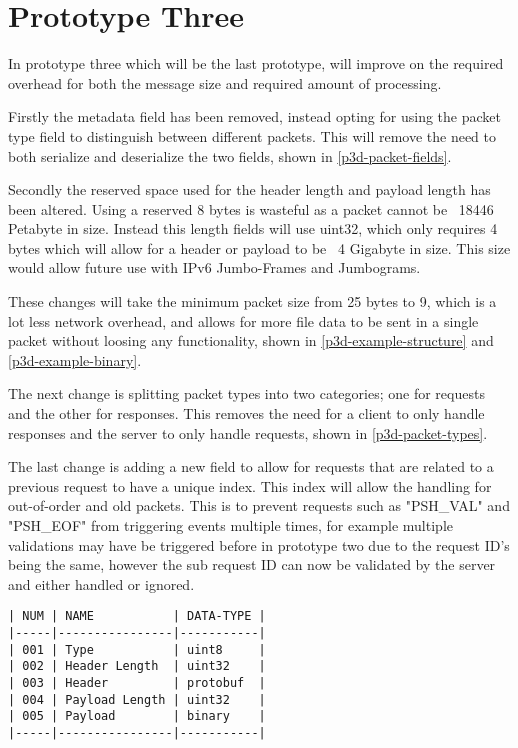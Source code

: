 \section{Prototype Three}
In prototype three which will be the last prototype, will improve on the required overhead for both the message size and required amount of processing.

Firstly the metadata field has been removed, instead opting for using the packet type field to distinguish between different packets. This will remove the need to both serialize and deserialize the two fields, shown in \ref{p3d-packet-fields}.

Secondly the reserved space used for the header length and payload length has been altered. Using a reserved 8 bytes is wasteful as a packet cannot be ~18446 Petabyte in size. Instead this length fields will use uint32, which only requires 4 bytes which will allow for a header or payload to be ~4 Gigabyte in size. This size would allow future use with IPv6 Jumbo-Frames and Jumbograms.

These changes will take the minimum packet size from 25 bytes to 9, which is a lot less network overhead, and allows for more file data to be sent in a single packet without loosing any functionality, shown in \ref{p3d-example-structure} and \ref{p3d-example-binary}.

The next change is splitting packet types into two categories; one for requests and the other for responses. This removes the need for a client to only handle responses and the server to only handle requests, shown in \ref{p3d-packet-types}.

The last change is adding a new field to allow for requests that are related to a previous request to have a unique index. This index will allow the handling for out-of-order and old packets. This is to prevent requests such as "PSH_VAL" and "PSH_EOF" from triggering events multiple times, for example multiple validations may have be triggered before in prototype two due to the request ID's being the same, however the sub request ID can now be validated by the server and either handled or ignored.

\FloatBarrier

\begin{lstlisting}[float,caption={Prototype Three Packet Fields},label=p3d-packet-fields]
| NUM | NAME           | DATA-TYPE |
|-----|----------------|-----------|
| 001 | Type           | uint8     |
| 002 | Header Length  | uint32    |
| 003 | Header         | protobuf  |
| 004 | Payload Length | uint32    |
| 005 | Payload        | binary    |
|-----|----------------|-----------|
\end{lstlisting}

